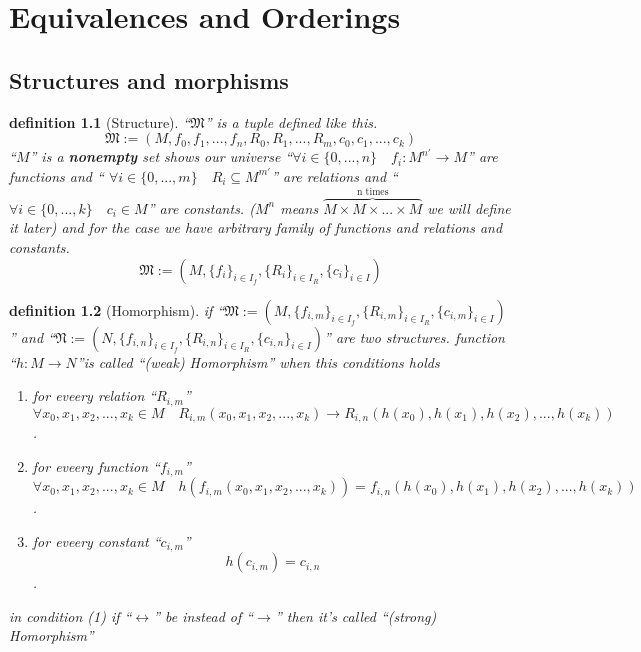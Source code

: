 \documentclass[10pt,a4paper]{book}
\newtheorem{definition}{definition}[section]
\begin{document}
\chapter{Equivalences and Orderings}

\section{Structures and morphisms}

\begin{definition} [Structure] 
    ``$\mathfrak{M} $'' is a tuple defined like this.
    \[\mathfrak{M}  := (M , f_{0}, f_{1},..., f_{n},R_{0}, R_{1} ,...,R_{m}, c_{0}, c_{1},..., c_{k}) \]
    ``$M$'' is a \textbf{nonempty} set shows our universe ``$\forall i \in \{ 0 , ... , n \} \quad f_i : M^{n'} \to M$'' are functions and ``
    $\forall i \in \{ 0 , ... , m \} \quad R_i \subseteq M^{m'}$''
    are relations and ``$\forall i \in \{ 0 , ... , k \} \quad c_i \in M  $'' are constants.
    ($M^n$ means $\overbrace{M \times M \times ... \times M}^{\text{n times}} $ we will define it later)
    and for the case we have arbitrary family of functions and relations and constants.
    \[\mathfrak{M}  := (M , \{f_i \}_{i \in I_f},\{R_i \}_{i \in I_R}, \{c_i \}_{i \in I}) \]
\end{definition}

\begin{definition}  [Homorphism]
    if  ``$\mathfrak{M} := (M , \{f_{i,m} \}_{i \in I_f},\{R_{i,m} \}_{i \in I_R}, \{c_{i,m} \}_{i \in I}) $''
    and ``$\mathfrak{N} := (N , \{f_{i,n} \}_{i \in I_f},\{R_{i,n} \}_{i \in I_R}, \{c_{i,n} \}_{i \in I}) $'' are two structures.
    function ``$h : M \to N$''is called ``(weak) Homorphism'' when this conditions holds
    \begin{enumerate}
        \setlength{\itemsep}{0pt} %
        \item for eveery relation ``$R_{i,m}$''
              \[ \forall x_0 , x_1 , x_2 , ... , x_k \in M \quad R_{i,m}(x_0 , x_1 , x_2 , ... , x_k) \to R_{i,n}(h(x_0),h(x_1) ,h(x_2), ... ,h(x_k)) \].
        \item for eveery function ``$f_{i,m}$''
              \[ \forall x_0 , x_1 , x_2 , ... , x_k \in M \quad h(f_{i,m}(x_0 , x_1 , x_2 , ... , x_k)) = f_{i,n}(h(x_0),h(x_1) ,h(x_2), ... ,h(x_k)) \].
        \item for eveery constant ``$c_{i,m}$''
              \[  h(c_{i,m}) = c_{i,n} \].
    \end{enumerate}
    in condition (1) if ``$\leftrightarrow$'' be instead of ``$\to $'' then it's called  ``(strong) Homorphism''
\end{definition}
\end{document}
